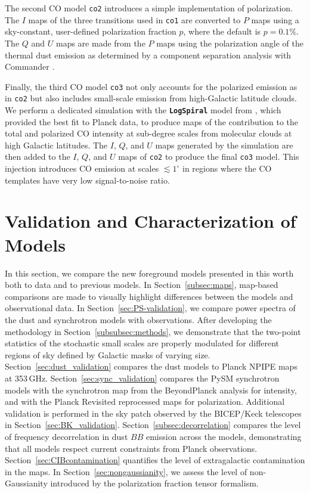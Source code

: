 \documentclass[twocolumn]{aastex631}
\begin{document}
The second CO model \texttt{co2} introduces a simple implementation of polarization. The $I$ maps of the three transitions used in \texttt{co1} are converted to $P$ maps using a sky-constant, user-defined polarization fraction $p$, where the default is $p = 0.1$\%. The $Q$ and $U$ maps are made from the $P$ maps using the polarization angle of the thermal dust emission as determined by a component separation analysis with Commander \citep{planck2014-a12}.

Finally, the third CO model \texttt{co3} not only accounts for the polarized emission as in \texttt{co2} but also includes small-scale emission from high-Galactic latitude clouds. We perform a dedicated simulation with the {\bf\texttt{LogSpiral}} model from \citet{Puglisi:2017}, which provided the best fit to Planck data, to produce maps of the contribution to the total and polarized CO intensity at sub-degree scales from molecular clouds at high Galactic latitudes. The $I$, $Q$, and $U$ maps generated by the simulation are then added to the $I$, $Q$, and $U$ maps of \texttt{co2} to produce the final \texttt{co3} model. This injection introduces CO emission at scales $\lesssim1^\circ$ in regions where the CO templates have very low signal-to-noise ratio. 

 
\section{Validation and Characterization of Models} \label{sec:validation}

In this section, we compare the new foreground models presented in this worth both to data and to previous models. In Section~\ref{subsec:maps}, map-based comparisons are made to visually highlight differences between the models and observational data. In Section~\ref{sec:PS-validation}, we compare power spectra of the dust and synchrotron models with observations. After developing the methodology in Section~\ref{subsubsec:methods}, we demonstrate that the two-point statistics of the stochastic small scales are properly modulated for different regions of sky defined by Galactic masks of varying size. Section~\ref{sec:dust_validation} compares the dust models to Planck NPIPE maps at 353\,GHz. Section~\ref{sec:sync_validation} compares the PySM synchrotron models with the synchrotron map from the BeyondPlanck analysis for intensity, and with the Planck Revisited reprocessed maps for polarization. Additional validation is performed in the sky patch observed by the BICEP/Keck telescopes in Section~\ref{sec:BK_validation}. Section~\ref{subsec:decorrelation} compares the level of frequency decorrelation in dust $BB$ emission across the models, demonstrating that all models respect current constraints from Planck observations. Section~\ref{sec:CIBcontamination} quantifies the level of extragalactic contamination in the maps. In Section~\ref{sec:nongaussianity}, we assess the level of non-Gaussianity introduced by the polarization fraction tensor formalism.
\end{document}
